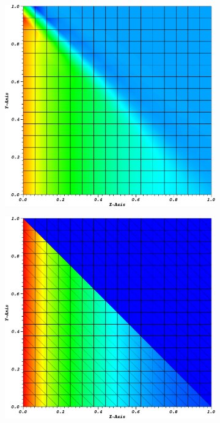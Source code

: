 \begin{figure}
\centering
{
	\begin{subfigure}[b]{0.485\textwidth}
		\centering
		\label{subfig::PA_Mesh_Tri}
		\includegraphics[width=\textwidth]{figures/sec_BF/PALeftSol_Cart.png}
	\end{subfigure}
	\hfill
	\begin{subfigure}[b]{0.485\textwidth}
		\centering
		\label{subfig::PA_Mesh_Cart}
		\includegraphics[width=\textwidth]{figures/sec_BF/PALeftSol_Tri.png}

\end{subfigure}}
\end{figure}
